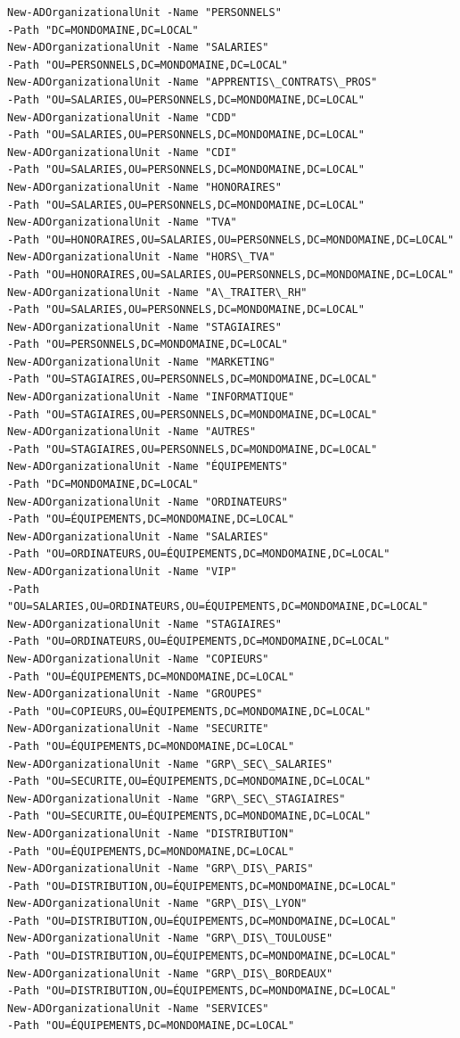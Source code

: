 \newpage

\begin{verbatim}
New-ADOrganizationalUnit -Name "PERSONNELS" 
-Path "DC=MONDOMAINE,DC=LOCAL"
New-ADOrganizationalUnit -Name "SALARIES" 
-Path "OU=PERSONNELS,DC=MONDOMAINE,DC=LOCAL"
New-ADOrganizationalUnit -Name "APPRENTIS\_CONTRATS\_PROS" 
-Path "OU=SALARIES,OU=PERSONNELS,DC=MONDOMAINE,DC=LOCAL"
New-ADOrganizationalUnit -Name "CDD" 
-Path "OU=SALARIES,OU=PERSONNELS,DC=MONDOMAINE,DC=LOCAL"
New-ADOrganizationalUnit -Name "CDI" 
-Path "OU=SALARIES,OU=PERSONNELS,DC=MONDOMAINE,DC=LOCAL"
New-ADOrganizationalUnit -Name "HONORAIRES" 
-Path "OU=SALARIES,OU=PERSONNELS,DC=MONDOMAINE,DC=LOCAL"
New-ADOrganizationalUnit -Name "TVA" 
-Path "OU=HONORAIRES,OU=SALARIES,OU=PERSONNELS,DC=MONDOMAINE,DC=LOCAL"
New-ADOrganizationalUnit -Name "HORS\_TVA" 
-Path "OU=HONORAIRES,OU=SALARIES,OU=PERSONNELS,DC=MONDOMAINE,DC=LOCAL"
New-ADOrganizationalUnit -Name "A\_TRAITER\_RH" 
-Path "OU=SALARIES,OU=PERSONNELS,DC=MONDOMAINE,DC=LOCAL"
New-ADOrganizationalUnit -Name "STAGIAIRES" 
-Path "OU=PERSONNELS,DC=MONDOMAINE,DC=LOCAL"
New-ADOrganizationalUnit -Name "MARKETING" 
-Path "OU=STAGIAIRES,OU=PERSONNELS,DC=MONDOMAINE,DC=LOCAL"
New-ADOrganizationalUnit -Name "INFORMATIQUE" 
-Path "OU=STAGIAIRES,OU=PERSONNELS,DC=MONDOMAINE,DC=LOCAL"
New-ADOrganizationalUnit -Name "AUTRES" 
-Path "OU=STAGIAIRES,OU=PERSONNELS,DC=MONDOMAINE,DC=LOCAL"
New-ADOrganizationalUnit -Name "ÉQUIPEMENTS" 
-Path "DC=MONDOMAINE,DC=LOCAL"
New-ADOrganizationalUnit -Name "ORDINATEURS" 
-Path "OU=ÉQUIPEMENTS,DC=MONDOMAINE,DC=LOCAL"
New-ADOrganizationalUnit -Name "SALARIES" 
-Path "OU=ORDINATEURS,OU=ÉQUIPEMENTS,DC=MONDOMAINE,DC=LOCAL"
New-ADOrganizationalUnit -Name "VIP" 
-Path "OU=SALARIES,OU=ORDINATEURS,OU=ÉQUIPEMENTS,DC=MONDOMAINE,DC=LOCAL"
New-ADOrganizationalUnit -Name "STAGIAIRES" 
-Path "OU=ORDINATEURS,OU=ÉQUIPEMENTS,DC=MONDOMAINE,DC=LOCAL"
New-ADOrganizationalUnit -Name "COPIEURS" 
-Path "OU=ÉQUIPEMENTS,DC=MONDOMAINE,DC=LOCAL"
New-ADOrganizationalUnit -Name "GROUPES" 
-Path "OU=COPIEURS,OU=ÉQUIPEMENTS,DC=MONDOMAINE,DC=LOCAL"
New-ADOrganizationalUnit -Name "SECURITE" 
-Path "OU=ÉQUIPEMENTS,DC=MONDOMAINE,DC=LOCAL"
New-ADOrganizationalUnit -Name "GRP\_SEC\_SALARIES" 
-Path "OU=SECURITE,OU=ÉQUIPEMENTS,DC=MONDOMAINE,DC=LOCAL"
New-ADOrganizationalUnit -Name "GRP\_SEC\_STAGIAIRES" 
-Path "OU=SECURITE,OU=ÉQUIPEMENTS,DC=MONDOMAINE,DC=LOCAL"
New-ADOrganizationalUnit -Name "DISTRIBUTION" 
-Path "OU=ÉQUIPEMENTS,DC=MONDOMAINE,DC=LOCAL"
New-ADOrganizationalUnit -Name "GRP\_DIS\_PARIS" 
-Path "OU=DISTRIBUTION,OU=ÉQUIPEMENTS,DC=MONDOMAINE,DC=LOCAL"
New-ADOrganizationalUnit -Name "GRP\_DIS\_LYON" 
-Path "OU=DISTRIBUTION,OU=ÉQUIPEMENTS,DC=MONDOMAINE,DC=LOCAL"
New-ADOrganizationalUnit -Name "GRP\_DIS\_TOULOUSE" 
-Path "OU=DISTRIBUTION,OU=ÉQUIPEMENTS,DC=MONDOMAINE,DC=LOCAL"
New-ADOrganizationalUnit -Name "GRP\_DIS\_BORDEAUX" 
-Path "OU=DISTRIBUTION,OU=ÉQUIPEMENTS,DC=MONDOMAINE,DC=LOCAL"
New-ADOrganizationalUnit -Name "SERVICES" 
-Path "OU=ÉQUIPEMENTS,DC=MONDOMAINE,DC=LOCAL"
\end{verbatim}

